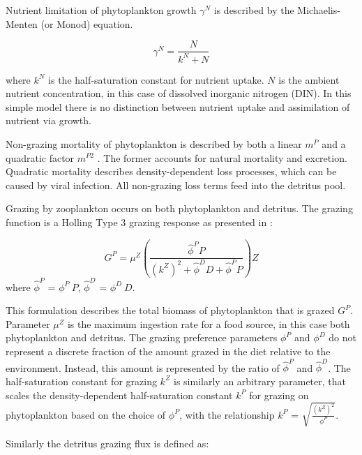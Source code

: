 \documentclass[journal abbreviation, manuscript]{copernicus}
\begin{document}
Nutrient limitation of phytoplankton growth $\gamma^N$ is described by the Michaelis-Menten (or Monod) equation.

\begin{equation}
    \gamma^N = \frac{N}{k^N + N}
\end{equation}

where $k^N$ is the half-saturation constant for nutrient uptake. $N$ is the ambient nutrient concentration, in this case of dissolved inorganic nitrogen (DIN). In this simple model there is no distinction between nutrient uptake and assimilation of nutrient via growth.

Non-grazing mortality of phytoplankton is described by both a linear $m^P$ and a quadratic factor $m^{P2}$ \citep{Yool2011Medusa-1.0:Domain}. The former accounts for natural mortality and excretion. Quadratic mortality describes density-dependent loss processes, which can be caused by viral infection. All non-grazing loss terms feed into the detritus pool.

Grazing by zooplankton occurs on both phytoplankton and detritus. The grazing function is a Holling Type 3 grazing response as presented in \citet{Anderson2015c}:

\begin{equation}
    G^P = \mu^Z \left( \frac{ \hat{\phi}^P P}{(k^Z)^2 + \hat{\phi}^D D +\hat{\phi}^P P}  \right) Z
\end{equation}
where $\hat{\phi}^P$ = $\phi^P \ P$, $\hat{\phi}^D$ = $\phi^D \ D$.

This formulation describes the total biomass of phytoplankton that is grazed $G^P$. Parameter $\mu^Z$ is the maximum ingestion rate for a food source, in this case both phytoplankton and detritus. 
The grazing preference parameters $\phi^P$ and $\phi^D$ do not represent a discrete fraction of the amount grazed in the diet relative to the environment. Instead, this amount is represented by the ratio of $\hat{\phi}^P$ and $\hat{\phi}^D$. 
The half-saturation constant for grazing $k^Z$ is similarly an arbitrary parameter, that scales the density-dependent half-saturation constant $k^P$ for grazing on phytoplankton based on the choice of $\phi^P$, with the relationship $k^P$ = $\sqrt{\frac{(k^Z)^2 }{ \phi^P}}$.


Similarly the detritus grazing flux is defined as:
\end{document}
